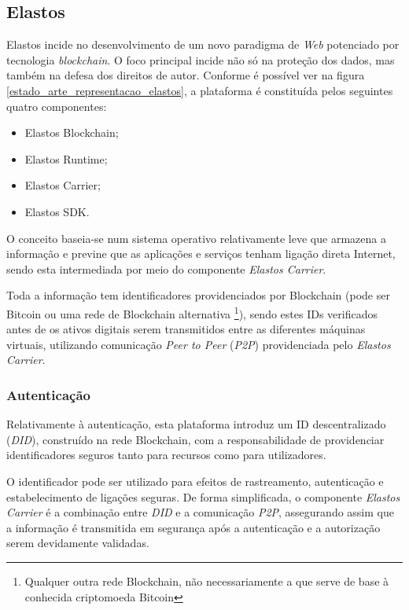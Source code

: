 \subsection{Elastos}
Elastos incide no desenvolvimento de um novo paradigma de \emph{Web} potenciado por tecnologia \emph{blockchain}\cite{a_bit_about_blockchain}. O foco principal incide não só na proteção dos dados, mas também na defesa dos direitos de autor. Conforme é possível ver na figura \ref{estado_arte_representacao_elastos}, a plataforma é constituída pelos seguintes quatro componentes:\cite{elastos_white_paper}
\begin{itemize}
	\item Elastos Blockchain;
	\item Elastos Runtime;
	\item Elastos Carrier;
	\item Elastos SDK.
\end{itemize}

O conceito baseia-se num sistema operativo relativamente leve que armazena a informação e previne que as aplicações e serviços tenham ligação direta Internet, sendo esta intermediada por meio do componente \emph{Elastos Carrier}. 

Toda a informação tem identificadores providenciados por Blockchain (pode ser Bitcoin ou uma rede de Blockchain alternativa \footnote{Qualquer outra rede Blockchain, não necessariamente a que serve de base à conhecida criptomoeda Bitcoin}), sendo estes IDs verificados antes de os ativos digitais serem transmitidos entre as diferentes máquinas virtuais, utilizando comunicação \emph{Peer to Peer} (\emph{P2P\label{sym:P2P}})\cite{what_are_P2P_networks} providenciada pelo \emph{Elastos Carrier}\cite{elastos_developer}.

\subsubsection{Autenticação}

Relativamente à autenticação, esta plataforma introduz um ID descentralizado (\emph{DID}\label{sym:DID}), construído na rede Blockchain, com a responsabilidade de providenciar identificadores seguros tanto para recursos como para utilizadores.

O identificador pode ser utilizado para efeitos de rastreamento, autenticação e estabelecimento de ligações seguras. De forma simplificada, o componente \emph{Elastos Carrier} é a combinação entre \emph{DID} e a comunicação \emph{P2P}, assegurando assim que a informação é transmitida em segurança após a autenticação e a autorização serem devidamente validadas\cite{elastos_white_paper}.

